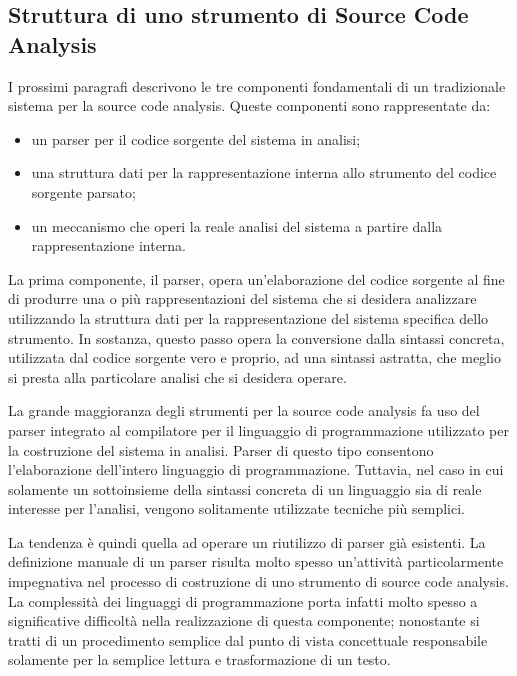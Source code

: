 \subsection{Struttura di uno strumento di Source Code Analysis}
\label{sca-architecture}

I prossimi paragrafi descrivono le tre componenti fondamentali di un
tradizionale sistema per la source code analysis. Queste componenti sono
rappresentate da:

\begin{itemize}

\item un parser per il codice sorgente del sistema in analisi;

\item una struttura dati per la rappresentazione interna allo strumento del
codice sorgente parsato;

\item un meccanismo che operi la reale analisi del sistema a partire dalla
rappresentazione interna.

\end{itemize}

La prima componente, il parser, opera un'elaborazione del codice sorgente al
fine di produrre una o più rappresentazioni del sistema che si desidera
analizzare utilizzando la struttura dati per la rappresentazione del sistema
specifica dello strumento. In sostanza, questo passo opera la conversione dalla
sintassi concreta, utilizzata dal codice sorgente vero e proprio, ad una
sintassi astratta, che meglio si presta alla particolare analisi che si desidera
operare.

La grande maggioranza degli strumenti per la source code analysis fa uso del
parser integrato al compilatore per il linguaggio di programmazione utilizzato
per la costruzione del sistema in analisi. Parser di questo tipo consentono
l’elaborazione dell’intero linguaggio di programmazione. Tuttavia, nel caso in
cui solamente un sottoinsieme della sintassi concreta di un linguaggio sia di
reale interesse per l’analisi, vengono solitamente utilizzate tecniche più
semplici.

La tendenza è quindi quella ad operare un riutilizzo di parser già esistenti. La
definizione manuale di un parser risulta molto spesso un'attività
particolarmente impegnativa nel processo di costruzione di uno strumento di
source code analysis. La complessità dei linguaggi di programmazione porta
infatti molto spesso a significative difficoltà nella realizzazione di questa
componente; nonostante si tratti di un procedimento semplice dal punto di vista
concettuale responsabile solamente per la semplice lettura e trasformazione di
un testo.\\

